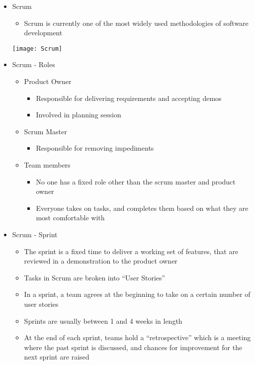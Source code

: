 \documentclass[11pt]{article}
\begin{document}
\begin{itemize}
		\item Scrum
			\begin{itemize}
				\item Scrum is currently one of the most widely used methodologies of software development\\[-15pt]
			\end{itemize}
			\begin{center}
				\texttt{[image: Scrum]}
			\end{center}

		\item Scrum - Roles
			\begin{itemize}
				\item Product Owner
					\begin{itemize}
						\item Responsible for delivering requirements and accepting demos
						\item Involved in planning session
					\end{itemize}
				\item Scrum Master
					\begin{itemize}
						\item Responsible for removing impediments
					\end{itemize}
				\item Team members
					\begin{itemize}
						\item No one has a fixed role other than the scrum master and product owner
						\item Everyone takes on tasks, and completes them based on what they are most comfortable with
					\end{itemize}
			\end{itemize}

		\item Scrum - Sprint
			\begin{itemize}
				\item The sprint is a fixed time to deliver a working set of features, that are reviewed in a demonstration to the product owner
				\item Tasks in Scrum are broken into “User Stories”
				\item In a sprint, a team agrees at the beginning to take on a certain
				number of user stories
				\item Sprints are usually between 1 and 4 weeks in length
				\item At the end of each sprint, teams hold a “retrospective” which is a meeting where the past sprint is discussed, and chances for improvement for the next sprint are raised
			\end{itemize}


\end{itemize}
\end{document}
